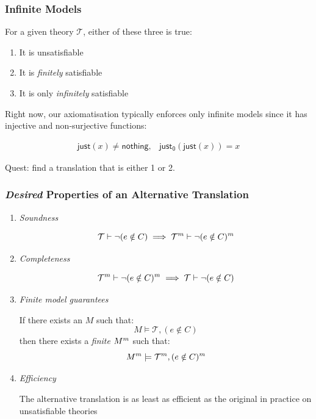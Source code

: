 \documentclass[serif,professionalfont]{beamer}
\begin{document}
\begin{frame}[fragile]
  \frametitle{Infinite Models}

  For a given theory $\mathcal{T}$, either of these three is true:

  \begin{enumerate}
    \item It is unsatisfiable

    \item It is \emph{finitely} satisfiable

    \item It is only \emph{infinitely} satisfiable
  \end{enumerate}

  Right now, our axiomatisation typically enforces only infinite
  models since it has injective and non-surjective functions:

  \[\begin{array}{ll}
  \mathsf{just}(x) \neq \mathsf{nothing}, &
  \mathsf{just_0}(\mathsf{just}(x)) = x
  \end{array}\]

  Quest: find a translation that is either 1 or 2.

\end{frame}



\begin{frame}[fragile]
  \frametitle{\emph{Desired} Properties of an Alternative Translation}

  \begin{enumerate}
    \item \emph{Soundness}

      $$\mathcal{T} \vdash \neg (e \notin C) \implies
        \mathcal{T}^{m} \vdash \neg (e \notin C)^{m}$$

    \item \emph{Completeness}

      $$\mathcal{T}^{m} \vdash \neg (e \notin C)^{m} \implies
        \mathcal{T} \vdash \neg (e \notin C)$$

    \item \emph{Finite model guarantees}

      If there exists an $M$ such that:
      $$M \models \mathcal{T} , (e \notin C)$$
      then there exists a \emph{finite} $M^{m}$ such that:
      $$M^{m} \models \mathcal{T}^{m} , (e \notin C)^{m}$$

    \item \emph{Efficiency}

      The alternative translation is as least as efficient as the
      original in practice on unsatisfiable theories
  \end{enumerate}

\end{frame}
\end{document}
